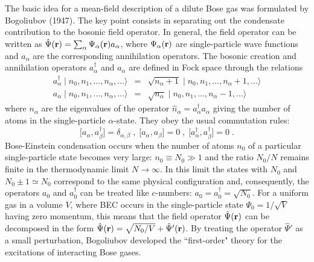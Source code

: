 The basic idea for a mean-field description of a dilute Bose
gas was formulated by Bogoliubov (1947). The key point
consists in separating out the condensate
contribution to the bosonic field operator. In general, the field
operator can be written as $\hat\Psi ({\bf r}) = \sum_\alpha
\Psi_\alpha ({\bf r})  a_\alpha$,  where $\Psi_\alpha ({\bf r})$
are single-particle wave functions and $a_\alpha$ are the
corresponding annihilation operators. The bosonic creation
and annihilation operators $a^{\dagger}_\alpha$ and $a_\alpha$ are
defined in Fock space through the relations
\begin{eqnarray}
a_{\alpha}^{\dagger} \mid n_0, n_1, \dots, n_{\alpha}, \dots
\rangle   & = &  \sqrt{n_{\alpha} + 1} \mid n_0, n_1, \dots,
n_{\alpha} +1,  \dots \rangle  \\ 
a_{\alpha} \mid n_0, n_1, \dots, n_{\alpha}, \dots \rangle & = & 
\sqrt{n_{\alpha}} \mid n_0, n_1, 
\dots, n_{\alpha} - 1, \dots \rangle 
\label{eq:aadagoperators}
\end{eqnarray}
where $n_{\alpha}$ are the eigenvalues of the operator
$\hat n_{\alpha}= a^{\dagger}_{\alpha}a_{\alpha}$ giving the
number of atoms in the single-particle $\alpha$-state. They 
obey the usual  commutation rules:
\begin{equation}
\big[ a_{\alpha}, a_{\beta}^{\dagger} \big] =  \delta_{\alpha, \beta}
\; , \;  \big[ a_{\alpha}, a_{\beta} \big]  =  0  \; , \; 
\big[ a_{\alpha}^{\dagger}, a_{\beta}^{\dagger} \big]  =  0 \; .
\label{eq:commrules }
\end{equation}
Bose-Einstein  condensation occurs when the number of atoms $n_0$ of a
particular single-particle state becomes very large: $n_0 \equiv N_0
\gg 1$ and the ratio $N_0/N$ remains finite in the thermodynamic limit
$N\to\infty$. In this limit the states with $N_0$ and $N_0 \pm 1\simeq
N_0$ correspond to the same physical configuration and, consequently, the
operators  $a_0$ and  $a_0^{\dagger}$ can be treated like $c$-numbers:
$a_0=a_0^{\dagger}=\sqrt{N_0}$. For a uniform gas in a volume $V$, where
BEC occurs in the single-particle state $\Psi_0= 1/\sqrt{V}$ having zero
momentum, this means that the field operator $\hat \Psi({\bf r})$ can
be decomposed in the form $\hat\Psi ({\bf r}) =  \sqrt{N_0/V} +
\hat\Psi' ({\bf r})$. By treating  the operator $\hat\Psi'$ as a small
perturbation, Bogoliubov developed the ``first-order" theory for the
excitations of interacting Bose gases.

